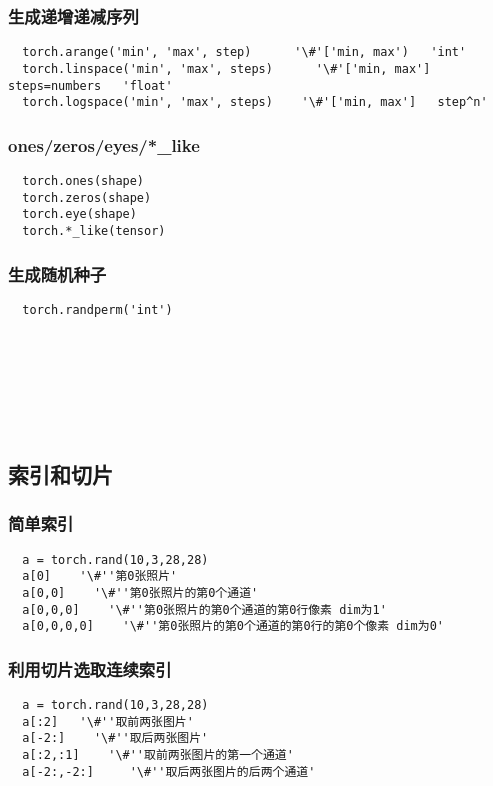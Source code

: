 \subsubsection{生成递增递减序列}
\begin{lstlisting}
  torch.arange('min', 'max', step)      '\#'['min, max')   'int'
  torch.linspace('min', 'max', steps)      '\#'['min, max']   steps=numbers   'float'
  torch.logspace('min', 'max', steps)    '\#'['min, max']   step^n'
\end{lstlisting}

\subsubsection{ones/zeros/eyes/*\_like}
\begin{lstlisting}
  torch.ones(shape)
  torch.zeros(shape)
  torch.eye(shape)
  torch.*_like(tensor)
\end{lstlisting}

\subsubsection{生成随机种子}
\begin{lstlisting}
  torch.randperm('int')
\end{lstlisting}
~\\
~\\
~\\
~\\
~\\





\subsection{索引和切片}
\subsubsection{简单索引}
\begin{lstlisting}
  a = torch.rand(10,3,28,28)
  a[0]    '\#''第0张照片'
  a[0,0]    '\#''第0张照片的第0个通道'
  a[0,0,0]    '\#''第0张照片的第0个通道的第0行像素 dim为1'
  a[0,0,0,0]    '\#''第0张照片的第0个通道的第0行的第0个像素 dim为0'
\end{lstlisting}

\subsubsection{利用切片选取连续索引}
\begin{lstlisting}
  a = torch.rand(10,3,28,28)
  a[:2]   '\#''取前两张图片'
  a[-2:]    '\#''取后两张图片'
  a[:2,:1]    '\#''取前两张图片的第一个通道'
  a[-2:,-2:]     '\#''取后两张图片的后两个通道'
\end{lstlisting}

